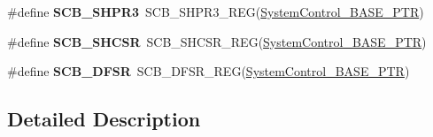 \begin{DoxyCompactItemize}
\#define {\bfseries S\+C\+B\+\_\+\+S\+H\+P\+R3}~S\+C\+B\+\_\+\+S\+H\+P\+R3\+\_\+\+R\+EG(\hyperlink{group___s_c_b___peripheral_gaf22864785770f832103e904244e078cb}{System\+Control\+\_\+\+B\+A\+S\+E\+\_\+\+P\+TR})
\item 
\mbox{\label{group___s_c_b___register___accessor___macros_ga00f70fc0cb709999835d54fb1a8d4112}} 
\#define {\bfseries S\+C\+B\+\_\+\+S\+H\+C\+SR}~S\+C\+B\+\_\+\+S\+H\+C\+S\+R\+\_\+\+R\+EG(\hyperlink{group___s_c_b___peripheral_gaf22864785770f832103e904244e078cb}{System\+Control\+\_\+\+B\+A\+S\+E\+\_\+\+P\+TR})
\item 
\mbox{\label{group___s_c_b___register___accessor___macros_gae3a7746f39eaa9eb3cd867d1dc327c8b}} 
\#define {\bfseries S\+C\+B\+\_\+\+D\+F\+SR}~S\+C\+B\+\_\+\+D\+F\+S\+R\+\_\+\+R\+EG(\hyperlink{group___s_c_b___peripheral_gaf22864785770f832103e904244e078cb}{System\+Control\+\_\+\+B\+A\+S\+E\+\_\+\+P\+TR})
\end{DoxyCompactItemize}


\subsection{Detailed Description}
